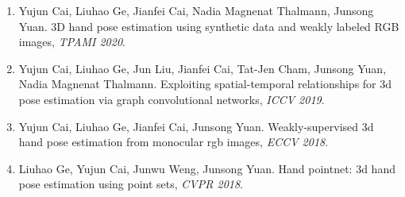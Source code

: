 \begin{enumerate}
\item Yujun Cai, Liuhao Ge, Jianfei Cai, Nadia Magnenat Thalmann, Junsong Yuan. 3D hand pose estimation using synthetic data and weakly labeled RGB images, \textit{TPAMI 2020}.

\item Yujun Cai, Liuhao Ge, Jun Liu, Jianfei Cai, Tat-Jen Cham, Junsong Yuan, Nadia Magnenat Thalmann. Exploiting spatial-temporal relationships for 3d pose estimation via graph convolutional networks, \textit{ICCV 2019}.

\item Yujun Cai, Liuhao Ge, Jianfei Cai, Junsong Yuan. Weakly-supervised 3d hand pose estimation from monocular rgb images, \textit{ECCV 2018}.

\item Liuhao Ge, Yujun Cai, Junwu Weng, Junsong Yuan. Hand pointnet: 3d hand pose estimation using point sets, \textit{CVPR 2018}.
\end{enumerate}